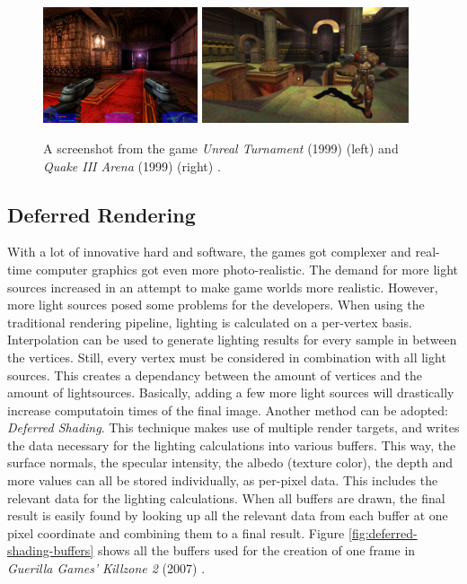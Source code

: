 \begin{figure}[h]
    \centering
    \includegraphics[width=172.5px]{images/graphics/unreal-turnament.jpg}
    \includegraphics[width=230px]{images/graphics/quake-iii-arena.jpg}
    \caption{A screenshot from the game \emph{Unreal Turnament} (1999) (left) and \emph{Quake III Arena} (1999) 
    (right) \cite{GamespotUnrealTurnament, GameWatcher2006}.}
    \label{fig:unreal-turnament-quake-arena}
\end{figure}


\subsection{Deferred Rendering}

With a lot of innovative hard and software, the games got complexer and real-time computer graphics got even more 
photo-realistic. The demand for more light sources increased in an attempt to make game worlds more realistic. 
However, more light sources posed some problems for the developers. When using the traditional rendering pipeline,
lighting is calculated on a per-vertex basis. Interpolation can be used to generate lighting results for every sample 
in between the vertices. Still, every vertex must be considered in combination with all light sources. This creates a 
dependancy between the amount of vertices and the amount of lightsources. Basically, adding a few more light sources 
will drastically increase computatoin times of the final image. Another method can be adopted: \emph{Deferred Shading}.
This technique makes use of multiple render targets, and writes the data necessary for the lighting calculations into 
various buffers. This way, the surface normals, the specular intensity, the albedo (texture color), the depth and more 
values can all be stored individually, as per-pixel data. This includes the relevant data for the lighting calculations. 
When all buffers are drawn, the final result is easily found by looking up all the relevant data from each buffer at one 
pixel coordinate and combining them to a final result. Figure \ref{fig:deferred-shading-buffers} shows all the buffers 
used for the creation of one frame in \emph{Guerilla Games'} \emph{Killzone 2} (2007) \cite{KillzoneFandom}. 

